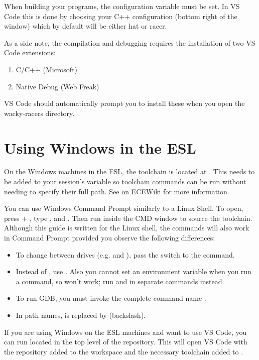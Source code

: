 When building your programs, the  configuration variable
must be set. In VS Code this is done by choosing your C++
configuration (bottom right of the window) which by default will be
either hat or racer.

As a side note, the compilation and debugging requires the
installation of two VS Code extensions:
%
\begin{enumerate}
\item C/C++ (Microsoft)
\item Native Debug (Web Freak)
\end{enumerate}
%
VS Code should automatically prompt you to install these when you open
  the wacky-racers directory.


\section{Using Windows in the ESL} \label{esl-windows}

On the Windows machines in the ESL, the toolchain is located at
. This needs to be
added to your session's  variable so toolchain commands can be run
without needing to specify their full path. See
 on ECEWiki for more
information.

You can use Windows Command Prompt similarly to a Linux Shell. To open, press
 + , type , and . Then run
 inside the CMD
window to source the toolchain. Although this guide is written for the Linux
shell, the commands will also work in Command Prompt provided you observe the
following differences:
\begin{itemize}
\item To change between drives (e.g.  and ), pass the
 switch to the  command.
\item Instead of , use .
Also you cannot set an environment variable when you run a command, so
 won't work; run  and  in
separate commands instead.
\item To run GDB, you must invoke the complete command name
.
\item In path names, \file{/} is replaced by \file{\textbackslash} (backslash).
\end{itemize}

If you are using Windows on the ESL machines and want to use VS Code, you can
run  located in the top level of the 
repository. This will open VS Code with the repository added to the workspace
and the necessary toolchain added to .
